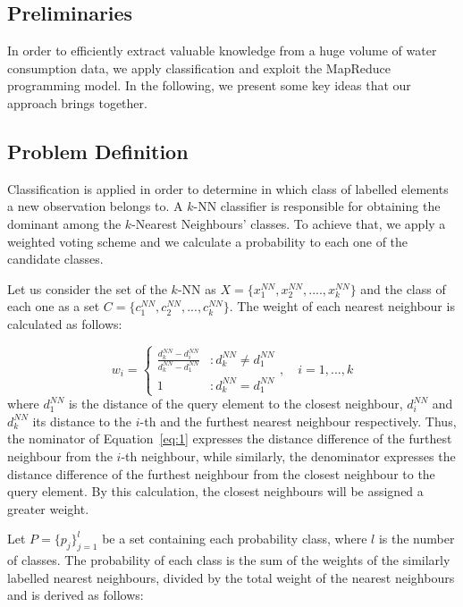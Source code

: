 \subsection{Preliminaries} 
\label{sec:preliminaries}
In order to efficiently extract valuable knowledge from a huge volume of water consumption data, we apply classification and exploit the MapReduce programming model. In the following, we present some key ideas that our approach brings together.

\subsection{Problem Definition}
\label{subsec:problem_definition}
Classification is applied in order to determine in which class of labelled elements a new observation belongs to. A $k$-NN classifier is responsible for obtaining the dominant among the $k$-Nearest Neighbours' classes. To achieve that, we apply a weighted voting scheme and we calculate a probability to each one of the candidate classes.

Let us consider the set of the $k$-NN as $X = \{x_{1}^{NN}, x_{2}^{NN}, ...., x_{k}^{NN}\}$ and the class of each one as a set $C = \{c_{1}^{NN}, c_{2}^{NN}, ..., c_{k}^{NN}\}$. The weight of each nearest neighbour is calculated as follows:

\begin{equation} \label{eq:1}
	w_{i} = \left\{
		\begin{array}{lr}
			\frac{d_{k}^{NN} - d_{i}^{NN}}{d_{k}^{NN} - d_{1}^{NN}} & : d_{k}^{NN} \neq d_{1}^{NN}\\
			1 & : d_{k}^{NN} = d_{1}^{NN}
		\end{array}
	\right., \quad i=1, ..., k
\end{equation}
where $d_{1}^{NN}$ is the distance of the query element to the closest neighbour, $d_{i}^{NN}$ and $d_{k}^{NN}$ its distance to the $i$-th and the furthest nearest neighbour respectively. Thus, the nominator of Equation~\ref{eq:1} expresses the distance difference of the furthest neighbour from the $i$-th neighbour, while similarly, the denominator expresses the distance difference of the furthest neighbour from the closest neighbour to the query element. By this calculation, the closest neighbours will be assigned a greater weight. 

Let $P = \{p_{j}\}_{j=1}^{l}$ be a set containing each probability class, where $l$ is the number of classes. The probability of each class is the sum of the weights of the similarly labelled nearest neighbours, divided by the total weight of the nearest neighbours and is derived as follows:

